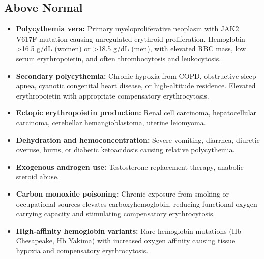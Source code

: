 \subsection*{Above Normal}
\begin{itemize}
  \item \textbf{Polycythemia vera:} Primary myeloproliferative neoplasm with JAK2 V617F mutation causing unregulated erythroid proliferation. Hemoglobin >16.5 g/dL (women) or >18.5 g/dL (men), with elevated RBC mass, low serum erythropoietin, and often thrombocytosis and leukocytosis.
  \item \textbf{Secondary polycythemia:} Chronic hypoxia from COPD, obstructive sleep apnea, cyanotic congenital heart disease, or high-altitude residence. Elevated erythropoietin with appropriate compensatory erythrocytosis.
  \item \textbf{Ectopic erythropoietin production:} Renal cell carcinoma, hepatocellular carcinoma, cerebellar hemangioblastoma, uterine leiomyoma.
  \item \textbf{Dehydration and hemoconcentration:} Severe vomiting, diarrhea, diuretic overuse, burns, or diabetic ketoacidosis causing relative polycythemia.
  \item \textbf{Exogenous androgen use:} Testosterone replacement therapy, anabolic steroid abuse.
  \item \textbf{Carbon monoxide poisoning:} Chronic exposure from smoking or occupational sources elevates carboxyhemoglobin, reducing functional oxygen-carrying capacity and stimulating compensatory erythrocytosis.
  \item \textbf{High-affinity hemoglobin variants:} Rare hemoglobin mutations (Hb Chesapeake, Hb Yakima) with increased oxygen affinity causing tissue hypoxia and compensatory erythrocytosis.
\end{itemize}

